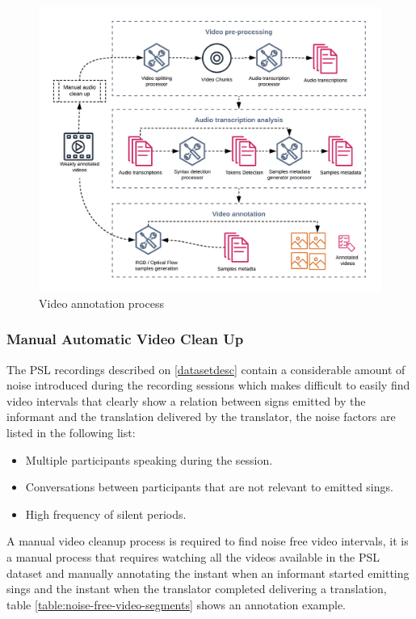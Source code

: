 \documentclass[twocolumn,conference]{article}
\begin{document}
\begin{figure}[hbt!]
\includegraphics[width=\linewidth]{images/video-annotation-pipeline.png}
\caption{Video annotation process}
\label{fig:video-annotation-pipeline}
\end{figure}

\subsubsection{Manual Automatic Video Clean Up}\label{manual-video-cleanup}
The PSL recordings described on \ref{datasetdesc} contain a considerable amount of noise introduced during the recording sessions which makes difficult to easily find video intervals that clearly show a relation between signs emitted by the informant and the translation delivered by the translator, the noise factors are listed in the following list:
\begin{itemize}
	\item Multiple participants speaking during the session.
	\item Conversations between participants that are not relevant to emitted sings.
	\item High frequency of silent periods.
\end{itemize}
A manual video cleanup process is required to find noise free video intervals, it is a manual process that requires watching all the videos available in the PSL dataset and manually annotating the instant when an informant started emitting sings and the instant when the translator completed delivering a translation, table \ref{table:noise-free-video-segments} shows an annotation example. 
\end{document}
